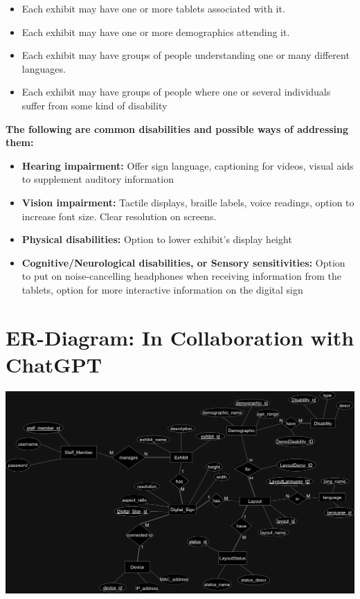 \documentclass{exam}
\begin{document}
\begin{itemize}
\item Each exhibit may have one or more tablets associated with it.
\item Each exhibit may have one or more demographics attending it.
\item Each exhibit may have groups of people understanding one or many different languages.
\item Each exhibit may have groups of people where one or several individuals suffer from some kind of disability
\end{itemize}
\bigskip

\pagebreak
\textbf{\large{The following are common disabilities and possible ways of addressing them:}}\\
\begin{itemize}
\item \textbf{Hearing impairment:} Offer sign language, captioning for videos, visual aids to supplement auditory information
\item \textbf{Vision impairment:} Tactile displays, braille labels, voice readings, option to increase font size. Clear resolution on screens.
\item \textbf{Physical disabilities:} Option to lower exhibit's display height
\item \textbf{Cognitive/Neurological disabilities, or Sensory sensitivities:} Option to put on noise-cancelling headphones when receiving information from the tablets, option for more interactive information on the digital sign
\end{itemize}
\bigskip

\pagebreak
\section*{ER-Diagram: In Collaboration with ChatGPT}
\bigskip
\begin{center}
\includegraphics[scale=0.18]{science_center.png}
\end{center}
\bigskip
\end{document}
